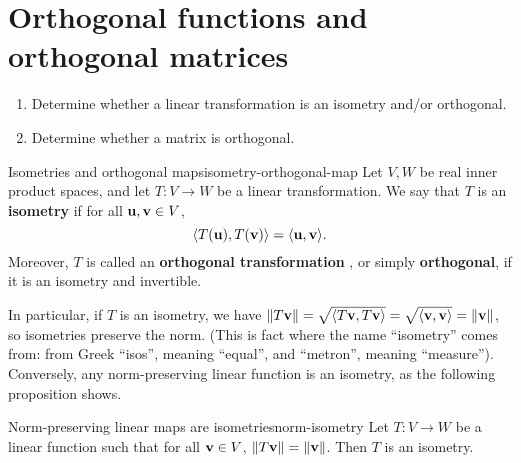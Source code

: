 \section{Orthogonal functions and orthogonal matrices}
\label{sec:orthogonal-matrices}

\begin{outcome}
  \begin{enumerate}
  \item Determine whether a linear transformation is an isometry
    and/or orthogonal.
  \item Determine whether a matrix is orthogonal.
  \end{enumerate}
\end{outcome}

\begin{definition}{Isometries and orthogonal maps}{isometry-orthogonal-map}
  Let $V,W$ be real inner product spaces, and let $T:V\to W$ be a
  linear transformation. We say that $T$ is an \textbf{isometry}%
   if for all
  $\vect{u},\vect{v}\in V$,
  \begin{equation*}
    \iprod{T(\vect{u}),T(\vect{v})} = \iprod{\vect{u},\vect{v}}.
  \end{equation*}
  Moreover, $T$ is called an \textbf{orthogonal transformation}%
  , or simply
  \textbf{orthogonal}, if it is an isometry and invertible.
\end{definition}

In particular, if $T$ is an isometry, we have
$\norm{T\vect{v}} = \sqrt{\iprod{T\vect{v},T\vect{v}}} =
\sqrt{\iprod{\vect{v},\vect{v}}} = \norm{\vect{v}}$, so isometries
preserve the norm. (This is fact where the name ``isometry'' comes
from: from Greek ``isos'', meaning ``equal'', and ``metron'', meaning
``measure''). Conversely, any norm-preserving linear function is an
isometry, as the following proposition shows.

\begin{proposition}{Norm-preserving linear maps are isometries}{norm-isometry}
  Let $T:V\to W$ be a linear function such that for all
  $\vect{v}\in V$, $\norm{T\vect{v}} = \norm{\vect{v}}$. Then $T$ is
  an isometry.
\end{proposition}

